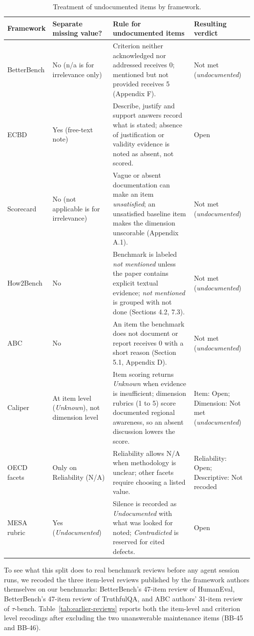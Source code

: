 \documentclass[10pt,conference]{IEEEtran}
\begin{document}
\begin{table}[t]
\caption{Treatment of undocumented items by framework.}
\label{tab:missing-rules}
\centering
\small
\begin{tabularx}{\textwidth}{@{}llXl@{}}
\toprule
\textbf{Framework} & \textbf{Separate missing value?} & \textbf{Rule for undocumented items} & \textbf{Resulting verdict} \\
\midrule
BetterBench & No (n/a is for irrelevance only) & Criterion neither acknowledged nor addressed receives 0; mentioned but not provided receives 5 (Appendix F). & Not met (\emph{undocumented}) \\
ECBD & Yes (free-text note) & Describe, justify and support answers record what is stated; absence of justification or validity evidence is noted as absent, not scored. & Open \\
Scorecard & No (not applicable is for irrelevance) & Vague or absent documentation can make an item \emph{unsatisfied}; an unsatisfied baseline item makes the dimension unscorable (Appendix A.1). & Not met (\emph{undocumented}) \\
How2Bench & No & Benchmark is labeled \emph{not mentioned} unless the paper contains explicit textual evidence; \emph{not mentioned} is grouped with not done (Sections 4.2, 7.3). & Not met (\emph{undocumented}) \\
ABC & No & An item the benchmark does not document or report receives 0 with a short reason (Section 5.1, Appendix D). & Not met (\emph{undocumented}) \\
Caliper & At item level (\emph{Unknown}), not dimension level & Item scoring returns \emph{Unknown} when evidence is insufficient; dimension rubrics (1 to 5) score documented regional awareness, so an absent discussion lowers the score. & Item: Open; Dimension: Not met (\emph{undocumented}) \\
OECD facets & Only on Reliability (N/A) & Reliability allows N/A when methodology is unclear; other facets require choosing a listed value. & Reliability: Open; Descriptive: Not recoded \\
MESA rubric & Yes (\emph{Undocumented}) & Silence is recorded as \emph{Undocumented} with what was looked for noted; \emph{Contradicted} is reserved for cited defects. & Open \\
\bottomrule
\end{tabularx}
\end{table}

To see what this split does to real benchmark reviews before any agent session runs, we recoded the three item-level reviews published by the framework authors themselves on our benchmarks: BetterBench's 47-item review of HumanEval, BetterBench's 47-item review of TruthfulQA, and ABC authors' 31-item review of $\tau$-bench. Table~\ref{tab:earlier-reviews} reports both the item-level and criterion level recodings after excluding the two unanswerable maintenance items (BB-45 and BB-46).
\end{document}
